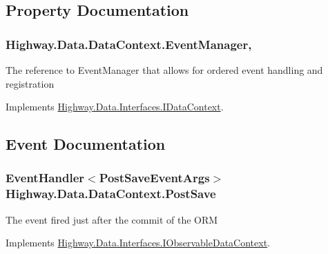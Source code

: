 \subsection{Property Documentation}
\hypertarget{class_highway_1_1_data_1_1_data_context_aebad01f13573f0ec22ab8a388c3093fd}{
\subsubsection[{Event\-Manager}]{ Highway.\-Data.\-Data\-Context.\-Event\-Manager\hspace{0.3cm}{\ttfamily [get]}, {\ttfamily [set]}}}\label{class_highway_1_1_data_1_1_data_context_aebad01f13573f0ec22ab8a388c3093fd}


The reference to Event\-Manager that allows for ordered event handling and registration 



Implements \hyperlink{interface_highway_1_1_data_1_1_interfaces_1_1_i_data_context_a66d20c659a7c50d08705534ad750e1f8}{Highway.\-Data.\-Interfaces.\-I\-Data\-Context}.



\subsection{Event Documentation}
\hypertarget{class_highway_1_1_data_1_1_data_context_a5363d61dfcaa37657d39a7439b4d6281}{
\subsubsection[{Post\-Save}]{\setlength{\rightskip}{0pt plus 5cm}Event\-Handler$<${\bf Post\-Save\-Event\-Args}$>$ Highway.\-Data.\-Data\-Context.\-Post\-Save}}\label{class_highway_1_1_data_1_1_data_context_a5363d61dfcaa37657d39a7439b4d6281}


The event fired just after the commit of the O\-R\-M 



Implements \hyperlink{interface_highway_1_1_data_1_1_interfaces_1_1_i_observable_data_context_a1978b914f7b94a37a6e86f3314326ca9}{Highway.\-Data.\-Interfaces.\-I\-Observable\-Data\-Context}.

